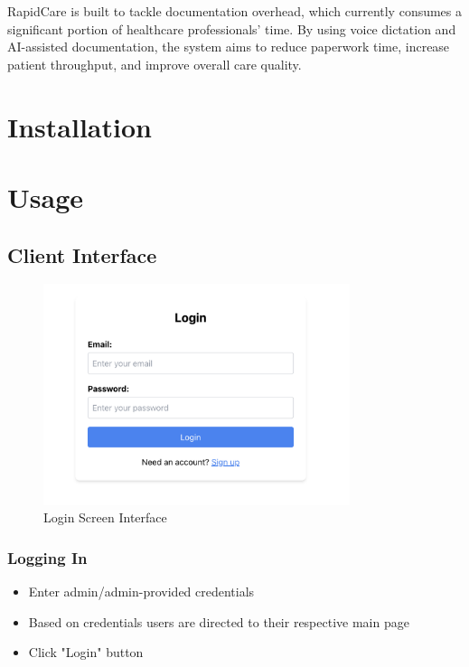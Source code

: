 \documentclass[12pt, titlepage]{article}
\begin{document}
RapidCare is built to tackle documentation overhead, which currently consumes a significant portion of healthcare professionals' time. By using voice dictation and AI-assisted documentation, the system aims to reduce paperwork time, increase patient throughput, and improve overall care quality.

\section{Installation}

\newpage

\section{Usage}
\subsection{Client Interface}
\begin{figure}[H]
\centering
\includegraphics[width=0.8\textwidth]{login.png}
\caption{Login Screen Interface}
\label{fig:login}
\end{figure}

\subsubsection{Logging In}
\begin{itemize}
\item Enter admin/admin-provided credentials
\item Based on credentials users are directed to their respective main page
\item Click "Login" button
\end{itemize}
\end{document}
